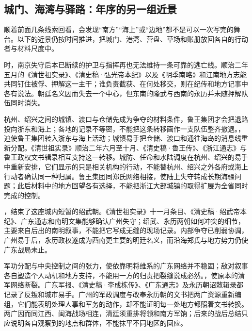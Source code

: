 \subsection*{城门、海湾与驿路：年序的另一组近景}

顺着前面几条线索回看，会发现“南方”“海上”或“边地”都不是可以一次写完的舞台。以下的近景仍按时间推进，把城门、港湾、营盘、草场和账册放回各自的行动者与材料尺度中。

\begin{event}
时，南京失守后本已断续的护卫与指挥再也无法维持一条可靠的逃亡线。顺治二年五月的《清世祖实录》、《清史稿·弘光帝本纪》以及《明季南略》和江南地方志能共同钉住被俘、押解这一主干；谁负责截获、在何处移交，则在纪传和地方记事中各有说法。朝廷名义因而失去一个中心，但东南的隆武与西南的永历并未随押解队伍同时消失。
\end{event}

\begin{event}
杭州、绍兴之间的城镇、渡口与仓储先成为争夺的材料条件，鲁王集团才会把退路投向浙东和海上；各地的记录不等密，不能把这条转移画作一支队伍整齐撤退。，迫使鲁王集团转入浙东与海上活动；城镇易手把仓储、渡口和通往海岛的消息线重新分配。《清世祖实录》顺治二年六月至十月、《清史稿·鲁王传》、《浙江通志》与鲁王政权文书辑录相互支持这一转移。城防、任命和水陆调度在杭州、绍兴的易手中重新安排，它们显示的只是相关机构的行动，不能替杭州、绍兴之外各府或海上行动者确认同一种归属。鲁王集团同郑氏网络相接，使陆上失守转成长期海疆问题；此后材料中的地方回望各有选择，不能把浙江大部城镇的取得扩展为全省同时完成的控制。
\end{event}

\begin{event}
，结束了这座城内短暂的绍武朝。《清世祖实录》十一月条目、《清史稿·绍武帝本纪》、广东通志和南明文集能够确认广州失守；绍武、永历两朝如何冲突的细节，主要来自后出的南明叙事，不能把它写成无缝的现场记录。内部争夺已削弱协调，广州易手后，永历政权遂成为西南更主要的明廷名义，而沿海郑氏与地方势力仍使广东战局未止。
\end{event}

\begin{event}
军功分配与中央控制之间的张力，使依靠明将维系的广东网络并不稳固；敌对叙事各自塑造个人动机和地方支持，不能用一方的归责把裂缝说成必然。，使原本的清军网络断裂。广东军报、《清史稿·李成栋传》、《广东通志》及永历朝诏敕辑录都记录了反叛和城市易手。广州的军政调度与改奉永历朝的文书把两广资源重新编组，它们能表明处理人事和军务的动作，却不能证明每一处地方都照着文书转换。两广因而同江西、闽海战场相连，清廷须重排将领和南方军饷；后来的战后总结只应说明各自观察到的地点和群体，不能抹平不同地区的回应。
\end{event}

